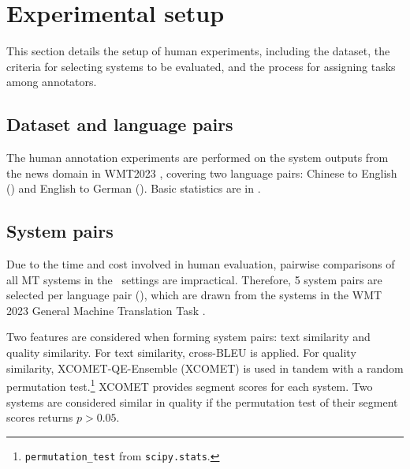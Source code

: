 \section{Experimental setup}\label{sec:exp_setup}

This section details the setup of human experiments, including the dataset, the criteria for selecting systems to be evaluated, and the process for assigning tasks among annotators.

\subsection{Dataset and language pairs}

The human annotation experiments are performed on the system outputs from the news domain in WMT2023 \citep{freitag-etal-2023-results}, covering two language pairs: Chinese to English (\ZhEn) and English to German (\EnDe). Basic statistics are in .



\subsection{System pairs}\label{sec:sys_pairs}

Due to the time and cost involved in human evaluation, pairwise comparisons of all MT systems in the \sxs~settings are impractical. Therefore, 5 system pairs are selected per language pair (), which are drawn from the systems in the WMT 2023 General Machine Translation Task \citep{kocmi-etal-2023-findings}.%



Two features are considered when forming system pairs: text similarity and quality similarity. For text similarity, cross-BLEU \citep{papineni-etal-2002-bleu} is applied. For quality similarity, XCOMET-QE-Ensemble (XCOMET) \citep{xcomet, freitag-etal-2023-results} is used in tandem with a random permutation test.\footnote{\texttt{permutation\_test} from \texttt{scipy.stats}.} XCOMET provides segment scores for each system. Two systems are considered similar in quality if the permutation test of their segment scores returns $p > 0.05$. 


